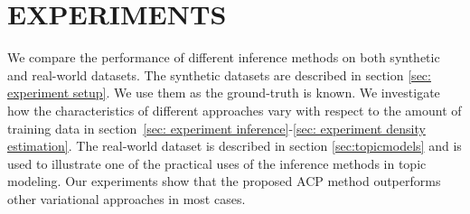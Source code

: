 \section{EXPERIMENTS}
\label{sec: experiments}
We compare the performance of different inference methods on both synthetic and real-world datasets. The synthetic datasets are described in section \ref{sec: experiment setup}. We use them as the ground-truth is known.  
We investigate how the characteristics of different approaches vary with respect to the amount of training data in section~\ref{sec: experiment inference}-\ref{sec: experiment density estimation}. 
The real-world dataset is described  in section \ref{sec:topicmodels} and is used to illustrate one of the practical uses of the inference methods in topic modeling.  
Our experiments show that the proposed ACP method outperforms other variational approaches in most cases.

